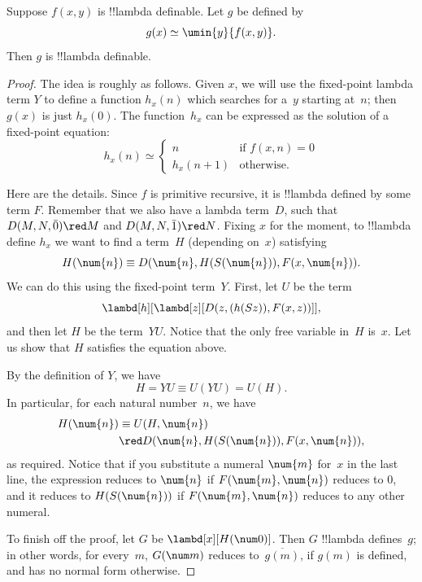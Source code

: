 \documentclass[../../../include/open-logic-section]{subfiles}
\begin{document}

\begin{lem}
Suppose $f(x,y)$ is !!{lambda definable}. Let $g$ be defined by
\[
g(x) \simeq \umin{y}{f(x,y)}.
\]
Then $g$ is !!{lambda definable}.
\end{lem}

\begin{proof}
The idea is roughly as follows. Given $x$, we will use the fixed-point
lambda term $Y$ to define a function $h_x(n)$ which searches for a~$y$
starting at~$n$; then $g(x)$ is just $h_x(0)$. The function~$h_x$ can
be expressed as the solution of a fixed-point equation:
\[
h_x(n) \simeq
\begin{cases}
n & \text{if $f(x,n) = 0$} \\
h_x(n+1) & \text{otherwise.}
\end{cases}
\]

Here are the details. Since $f$ is primitive recursive, it is
!!{lambda defined} by some term $F$. Remember that we also have a lambda
term~$D$, such that $D(M, N, \bar{0}) \red M$ and $D(M, N, \bar{1})
\red N$. Fixing $x$ for the moment, to !!{lambda define} $h_x$ we want to
find a term~$H$ (depending on~$x$) satisfying
\[
H(\num{n}) \equiv D(\num{n}, H(S(\num{n})), F(x, \num{n})).
\]
We can do this using the fixed-point term~$Y$. First, let $U$ be the
term
\[
\lambd[h][\lambd[z][D(z,(h(Sz)),F(x,z))]],
\]
and then let $H$ be the term~$YU$. Notice that the only free variable
in~$H$ is~$x$. Let us show that $H$ satisfies the equation above.

By the definition of $Y$, we have
\[
H = YU \equiv U(YU) = U(H).
\]
In particular, for each natural number~$n$, we have
\begin{align*}
H(\num{n}) & \equiv U(H, \num{n}) \\
& \red D(\num{n}, H(S(\num{n})), F(x, \num{n})),
\end{align*}
as required. Notice that if you substitute a numeral $\num{m}$ for~$x$
in the last line, the expression reduces to $\num{n}$ if $F(\num{m},
\num{n})$ reduces to $\num{0}$, and it reduces to $H(S(\num{n}))$ if
$F(\num{m}, \num{n})$ reduces to any other numeral.

To finish off the proof, let $G$ be $\lambd[x][H(\num 0)]$. Then $G$
!!{lambda define}s~$g$; in other words, for every~$m$, $G(\num m)$
reduces to~$\overline {g(m)}$, if $g(m)$ is defined, and has no normal
form otherwise.
\end{proof}
\end{document}
